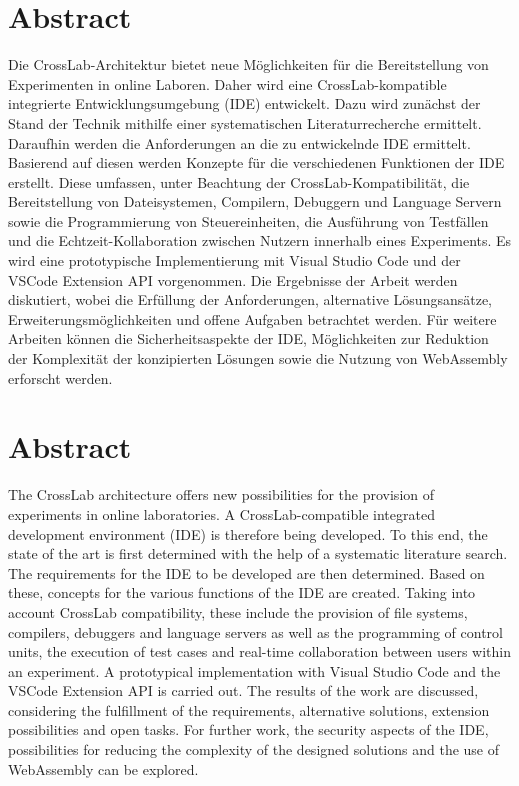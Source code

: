 \section*{Abstract}
Die CrossLab-Architektur bietet neue Möglichkeiten für die Bereitstellung von Experimenten in online Laboren. Daher wird eine CrossLab-kompatible integrierte Entwicklungsumgebung (IDE) entwickelt. Dazu wird zunächst der Stand der Technik mithilfe einer systematischen Literaturrecherche ermittelt. Daraufhin werden die Anforderungen an die zu entwickelnde IDE ermittelt. Basierend auf diesen werden Konzepte für die verschiedenen Funktionen der IDE erstellt. Diese umfassen, unter Beachtung der CrossLab-Kompatibilität, die Bereitstellung von Dateisystemen, Compilern, Debuggern und Language Servern sowie die Programmierung von Steuereinheiten, die Ausführung von Testfällen und die Echtzeit-Kollaboration zwischen Nutzern innerhalb eines Experiments. Es wird eine prototypische Implementierung mit Visual Studio Code und der VSCode Extension API vorgenommen. Die Ergebnisse der Arbeit werden diskutiert, wobei die Erfüllung der Anforderungen, alternative Lösungsansätze, Erweiterungsmöglichkeiten und offene Aufgaben betrachtet werden. Für weitere Arbeiten können die Sicherheitsaspekte der IDE, Möglichkeiten zur Reduktion der Komplexität der konzipierten Lösungen sowie die Nutzung von WebAssembly erforscht werden.
\vspace*{\fill}
\section*{Abstract}
The CrossLab architecture offers new possibilities for the provision of experiments in online laboratories. A CrossLab-compatible integrated development environment (IDE) is therefore being developed. To this end, the state of the art is first determined with the help of a systematic literature search. The requirements for the IDE to be developed are then determined. Based on these, concepts for the various functions of the IDE are created. Taking into account CrossLab compatibility, these include the provision of file systems, compilers, debuggers and language servers as well as the programming of control units, the execution of test cases and real-time collaboration between users within an experiment. A prototypical implementation with Visual Studio Code and the VSCode Extension API is carried out. The results of the work are discussed, considering the fulfillment of the requirements, alternative solutions, extension possibilities and open tasks. For further work, the security aspects of the IDE, possibilities for reducing the complexity of the designed solutions and the use of WebAssembly can be explored.